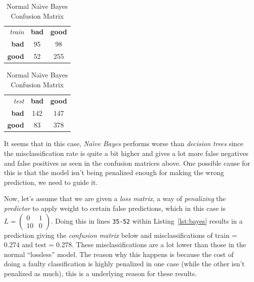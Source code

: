 \documentclass[a4paper, twocolumn]{article}
\begin{document}
        \begin{table}[h]
        \begin{center}
        \begin{tabular}{r|c|c|}
            \multicolumn{1}{r}{\emph{train}}
            &\multicolumn{1}{c}{\textbf{bad}}
            &\multicolumn{1}{c}{\textbf{good}} \\
            \cline{2-3}
            \textbf{bad} & 95 & 98 \\
            \cline{2-3}
            \textbf{good} & 52 & 255 \\
            \cline{2-3}
        \end{tabular}
        \begin{tabular}{r|c|c|}
            \multicolumn{1}{r}{\emph{test}}
            &\multicolumn{1}{c}{\textbf{bad}}
            &\multicolumn{1}{c}{\textbf{good}} \\
            \cline{2-3}
            \textbf{bad} & 142 & 147 \\
            \cline{2-3}
            \textbf{good} & 83 & 378 \\
            \cline{2-3}
        \end{tabular}
        \end{center}
        \caption{Normal Na{\"\i}ve Bayes Confusion Matrix}
        \label{table:bayes}
        \end{table}

        It seems that in this case, \emph{Na{\"\i}ve Bayes} performs worse than \emph{decision trees} since the misclassification rate is quite a bit higher and gives a lot more false negatives and false positives as seen in the confusion matrices above. One possible cause for this is that the model isn't being penalized enough for making the wrong prediction, we need to guide it.

        Now, let's assume that we are given a \emph{loss matrix}, a way of \emph{penalizing} the \emph{predictor} to apply weight to certain false predictions, which in this case is $L = \left( \begin{smallmatrix}0&1\\10&0\end{smallmatrix} \right)$. Doing this in lines \texttt{35-52} within Listing~\ref{lst:bayes} results in a prediction giving the \emph{confusion matrix} below and misclassifications of train = 0.274 and test = 0.278. These misclassifications are a lot lower than those in the normal ``lossless'' model. The reason why this happens is because the cost of doing a faulty classification is highly penalized in one case (while the other isn't penalized as much), this is a underlying reason for these results.
\end{document}
